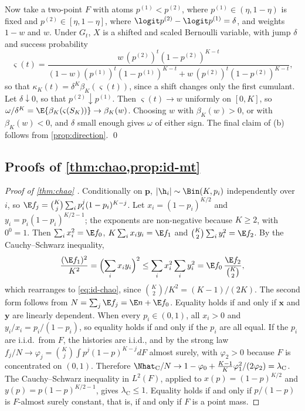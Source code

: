 Now take a two-point $F$ with atoms $p^{(1)}<p^{(2)}$, where $p^{(1)}\in(\eta,1-\eta)$ is fixed and $p^{(2)}\in[\eta,1-\eta]$, where $\logit p^{(2)}-\logit p^{(1)}=\delta$, and weights $1-w$ and $w$. Under $G_t$, $X$ is a shifted and scaled Bernoulli variable, with jump $\delta$ and success probability
\[
  \varsigma(t)=\frac{w\,(p^{(2)})^t(1-p^{(2)})^{K-t}}{(1-w)(p^{(1)})^t(1-p^{(1)})^{K-t}+w\,(p^{(2)})^t(1-p^{(2)})^{K-t}},
\]
so that $\kappa_K(t)=\delta^K\beta_K(\varsigma(t))$, since a shift changes only the first cumulant. Let $\delta\downarrow0$, so that $p^{(2)}\downarrow p^{(1)}$. Then $\varsigma(t)\to w$ uniformly on $[0,K]$, so $\omega/\delta^K=\E\{\beta_K(\varsigma(S_K))\}\to\beta_K(w)$. Choosing $w$ with $\beta_K(w)>0$, or with $\beta_K(w)<0$, and $\delta$ small enough gives $\omega$ of either sign. The final claim of (b) follows from \cref{prop:direction}. \qed

\subsection{Proofs of \texorpdfstring{\cref{thm:chao,prop:id-mt}}{the Chao bound and its reversal}}\label{app:id-chao}

\begin{proof}[Proof of \cref{thm:chao} \citep{chao1987}]
Conditionally on $\bm p$, $|\h_i|\sim\Bin(K,p_i)$ independently over $i$, so $\E f_j=\binom Kj\sum_ip_i^j(1-p_i)^{K-j}$. Let $x_i=(1-p_i)^{K/2}$ and $y_i=p_i(1-p_i)^{K/2-1}$; the exponents are non-negative because $K\ge2$, with $0^0=1$. Then $\sum_ix_i^2=\E f_0$, $K\sum_ix_iy_i=\E f_1$ and $\binom K2\sum_iy_i^2=\E f_2$. By the Cauchy--Schwarz inequality,
\[
  \frac{(\E f_1)^2}{K^2}=\Bigl(\sum_ix_iy_i\Bigr)^2\le\sum_ix_i^2\sum_iy_i^2=\E f_0\,\frac{\E f_2}{\binom K2},
\]
which rearranges to \eqref{eq:id-chao}, since $\binom K2/K^2=(K-1)/(2K)$. The second form follows from $N=\sum_j\E f_j=\E n+\E f_0$. Equality holds if and only if $\bm x$ and $\bm y$ are linearly dependent. When every $p_i\in(0,1)$, all $x_i>0$ and $y_i/x_i=p_i/(1-p_i)$, so equality holds if and only if the $p_i$ are all equal. If the $p_i$ are i.i.d.\ from $F$, the histories are i.i.d., and by the strong law $f_j/N\to\varphi_j=\binom Kj\int p^j(1-p)^{K-j}dF$ almost surely, with $\varphi_2>0$ because $F$ is concentrated on $(0,1)$. Therefore
$\Nhat_{\mathrm C}/N\to1-\varphi_0+\frac{K-1}{K}\varphi_1^2/(2\varphi_2)=\lambda_{\mathrm C}$.
The Cauchy--Schwarz inequality in $L^2(F)$, applied to $x(p)=(1-p)^{K/2}$ and $y(p)=p(1-p)^{K/2-1}$, gives $\lambda_{\mathrm C}\le1$. Equality holds if and only if $p/(1-p)$ is $F$-almost surely constant, that is, if and only if $F$ is a point mass.
\end{proof}

